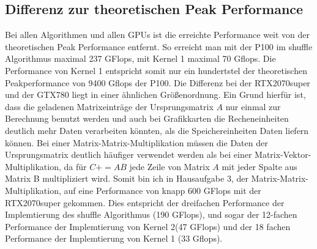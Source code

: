 \documentclass[10pt,a4paper]{article}
\begin{document}
	  \subsection{Differenz zur theoretischen Peak Performance}
	  Bei allen Algorithmen und allen GPUs ist die erreichte Performance weit von der theoretischen Peak Performance entfernt. So erreicht man mit der P100 im shuffle Algorithmus maximal 237 GFlops, mit Kernel 1 maximal 70 Gflops. Die Performance von Kernel 1 entspricht somit nur ein hundertstel der theoretischen Peakperformance von 9400 Gflops der P100. Die Differenz bei der RTX2070super und der GTX780 liegt in einer ähnlichen Größenordnung. Ein Grund hierfür ist, dass die geladenen Matrixeinträge der Ursprungsmatrix $A$ nur einmal zur Berechnung benutzt werden und auch bei Grafikkarten die Recheneinheiten deutlich mehr Daten verarbeiten könnten, als die Speichereinheiten Daten liefern können. Bei einer Matrix-Matrix-Multiplikation müssen die Daten der Ursprungsmatrix deutlich häufiger verwendet werden als bei einer Matrix-Vektor-Multiplikation, da für $C+=AB$ jede Zeile von Matrix $A$ mit jeder Spalte aus Matrix B multipliziert wird. Somit bin ich in Hausaufgabe 3, der Matrix-Matrix-Multiplikation, auf eine Performance von knapp 600 GFlops mit der RTX2070super gekommen. Dies entspricht der dreifachen Performance der Implemtierung des shuffle Algorithmus (190 GFlops), und sogar der 12-fachen Performance der Implemtierung von Kernel 2(47 GFlops) und der 18 fachen Performance der Implemtierung von Kernel 1 (33 Gflops).
\end{document}
